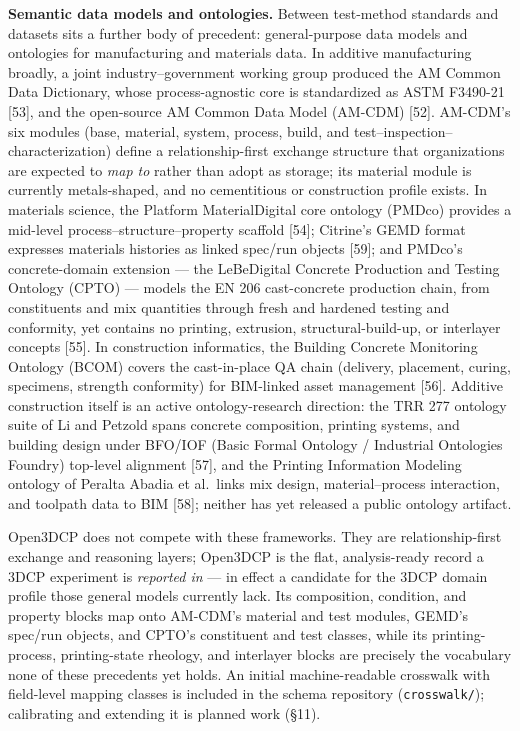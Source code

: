\documentclass[
  11pt,
  letterpaper,
]{article}
\newcounter{none} %
\begin{document}
\textbf{Semantic data models and ontologies.} Between test-method
standards and datasets sits a further body of precedent: general-purpose
data models and ontologies for manufacturing and materials data. In
additive manufacturing broadly, a joint industry--government working
group produced the AM Common Data Dictionary, whose process-agnostic
core is standardized as ASTM F3490-21 {[}53{]}, and the open-source AM
Common Data Model (AM-CDM) {[}52{]}. AM-CDM's six modules (base,
material, system, process, build, and
test--inspection--characterization) define a relationship-first exchange
structure that organizations are expected to \emph{map to} rather than
adopt as storage; its material module is currently metals-shaped, and no
cementitious or construction profile exists. In materials science, the
Platform MaterialDigital core ontology (PMDco) provides a mid-level
process--structure--property scaffold {[}54{]}; Citrine's GEMD format
expresses materials histories as linked spec/run objects {[}59{]}; and
PMDco's concrete-domain extension --- the LeBeDigital Concrete
Production and Testing Ontology (CPTO) --- models the EN 206
cast-concrete production chain, from constituents and mix quantities
through fresh and hardened testing and conformity, yet contains no
printing, extrusion, structural-build-up, or interlayer concepts
{[}55{]}. In construction informatics, the Building Concrete Monitoring
Ontology (BCOM) covers the cast-in-place QA chain (delivery, placement,
curing, specimens, strength conformity) for BIM-linked asset management
{[}56{]}. Additive construction itself is an active ontology-research
direction: the TRR 277 ontology suite of Li and Petzold spans concrete
composition, printing systems, and building design under BFO/IOF (Basic
Formal Ontology / Industrial Ontologies Foundry) top-level alignment
{[}57{]}, and the Printing Information Modeling ontology of Peralta
Abadia et al.~links mix design, material--process interaction, and
toolpath data to BIM {[}58{]}; neither has yet released a public
ontology artifact.

Open3DCP does not compete with these frameworks. They are
relationship-first exchange and reasoning layers; Open3DCP is the flat,
analysis-ready record a 3DCP experiment is \emph{reported in} --- in
effect a candidate for the 3DCP domain profile those general models
currently lack. Its composition, condition, and property blocks map onto
AM-CDM's material and test modules, GEMD's spec/run objects, and CPTO's
constituent and test classes, while its printing-process, printing-state
rheology, and interlayer blocks are precisely the vocabulary none of
these precedents yet holds. An initial machine-readable crosswalk with
field-level mapping classes is included in the schema repository
(\texttt{crosswalk/}); calibrating and extending it is planned work
(§11).
\end{document}
